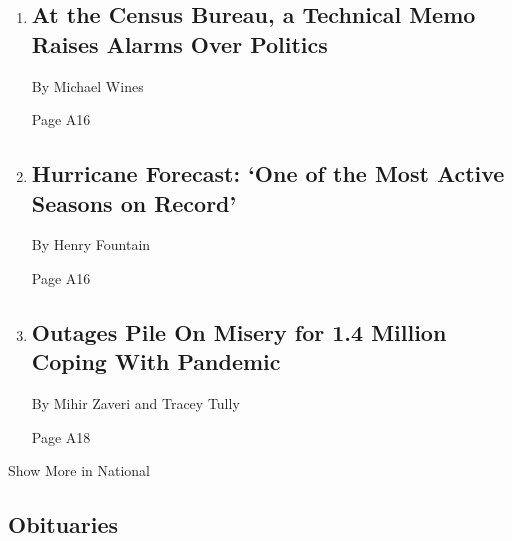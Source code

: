 \begin{enumerate}
\def\labelenumi{\arabic{enumi}.}
\item
  \href{/2020/08/06/us/2020-census-undocumented-immigrants.html}{}

  \hypertarget{at-the-census-bureau-a-technical-memo-raises-alarms-over-politics-1}{%
  \subsection{At the Census Bureau, a Technical Memo Raises Alarms Over
  Politics}\label{at-the-census-bureau-a-technical-memo-raises-alarms-over-politics-1}}

  By Michael Wines

  Page A16
\item
  \href{/2020/08/06/climate/hurricanes-noaa-prediction.html}{}

  \hypertarget{hurricane-forecast-one-of-the-most-active-seasons-on-record}{%
  \subsection{Hurricane Forecast: `One of the Most Active Seasons on
  Record'}\label{hurricane-forecast-one-of-the-most-active-seasons-on-record}}

  By Henry Fountain

  Page A16
\item
  \href{/2020/08/06/nyregion/isaias-storm-power-outages.html}{}

  \hypertarget{outages-pile-on-misery-for-14-million-coping-with-pandemic}{%
  \subsection{Outages Pile On Misery for 1.4 Million Coping With
  Pandemic}\label{outages-pile-on-misery-for-14-million-coping-with-pandemic}}

  By Mihir Zaveri and Tracey Tully

  Page A18
\end{enumerate}

Show More in National

\hypertarget{obituaries}{%
\subsection{Obituaries}\label{obituaries}}


